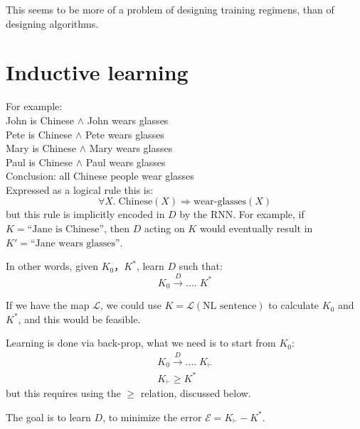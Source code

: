 \documentclass[12pt]{article}
\newcommand{\tab}{\hspace*{1cm}}
\begin{document}
This seems to be more of a problem of designing training regimens, than of designing algorithms.

\section{Inductive learning}

For example:\\
\tab John is Chinese $\wedge$ John wears glasses \\
\tab Pete is Chinese $\wedge$ Pete wears glasses \\
\tab Mary is Chinese $\wedge$ Mary wears glasses \\
\tab Paul is Chinese $\wedge$ Paul wears glasses \\
\tab Conclusion: all Chinese people wear glasses \\
Expressed as a logical rule this is:
$$ \forall X. \; \mbox{Chinese}(X) \Rightarrow \mbox{wear-glasses}(X) $$
but this rule is implicitly encoded in $D$ by the RNN.  For example, if $K = \mbox{``Jane is Chinese''}$, then $D$ acting on $K$ would eventually result in $K' = \mbox{``Jane wears glasses''}$.

In other words, given $K_0$，$K^*$, learn $D$ such that:
$$ K_0 \stackrel{D}{\longrightarrow} .... \; K^* $$

If we have the map $\mathcal{L}$, we could use $K = \mathcal{L}(\mbox{NL sentence})$ to calculate $K_0$ and $K^*$, and this would be feasible.

Learning is done via back-prop, what we need is to start from $K_0$:
\begin{eqnarray}
K_0 \stackrel{D}{\longrightarrow} .... \; K_\vdash \nonumber \\
K_\vdash \ge K^* \nonumber
\end{eqnarray}
but this requires using the $\ge$ relation, discussed below.

The goal is to learn $D$, to minimize the error $\mathcal{E} = K_\vdash - K^*$.
\end{document}

